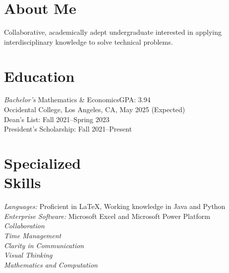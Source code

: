 \documentclass[margin, 10pt]{res} %
\begin{document}
\begin{resume}

\section{\sc About Me}
Collaborative, academically adept undergraduate interested in applying interdisciplinary knowledge to solve technical problems.

\section{\sc Education}

{\sl Bachelor's} Mathematics \& Economics\hfill GPA: 3.94 \\
Occidental College, Los Angeles, CA, May 2025 (Expected) \\
Dean's List: Fall 2021--Spring 2023\\
President's Scholarship: Fall 2021--Present

\section{\sc Specialized \\ Skills} 

{\sl Languages:} Proficient in \LaTeX, Working knowledge in Java and Python\\
{\sl Enterprise Software:} Microsoft Excel and Microsoft Power Platform\\
{\sl Collaboration}\\
{\sl Time Management}\\
{\sl Clarity in Communication}\\
{\sl Visual Thinking}\\
{\sl Mathematics and Computation}
 
 

\end{resume}
\end{document}
